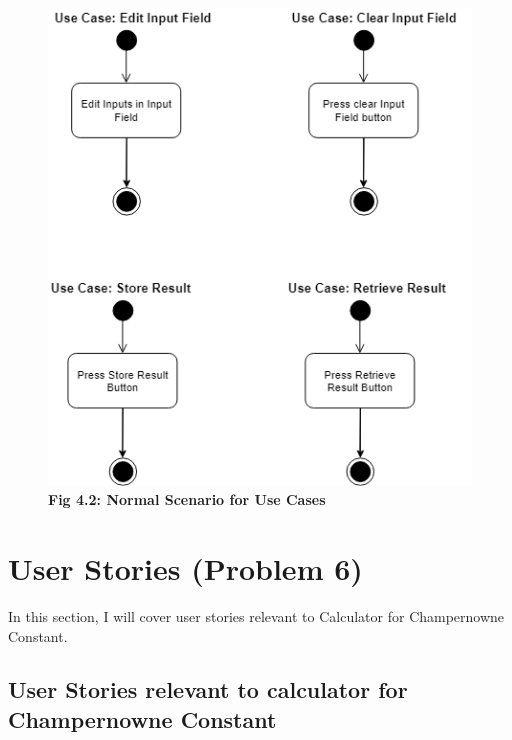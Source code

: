 \documentclass[paper=a4, fontsize=11pt]{report}
\numberwithin{equation}{section}		%
\numberwithin{figure}{section}			%
\numberwithin{table}{section}				%
\begin{document}
\pagebreak
\begin{figure}[htp]
    \centering
    \includegraphics[width=15cm]{NormalScenario2.png}
    \caption*{\textbf{Fig 4.2: Normal Scenario for Use Cases}}
\end{figure}




\chapter{User Stories (Problem 6)}
In this section, I will cover user stories relevant to Calculator for Champernowne Constant. \newline

  
\section{User Stories relevant to calculator for Champernowne Constant }
\end{document}
